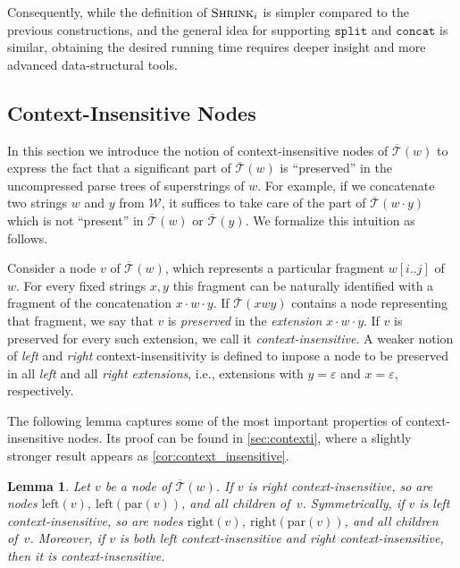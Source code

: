 \documentclass[a4paper]{article}
\newtheorem{lemma}[theorem]{Lemma}
\theoremstyle{remark}
\newcommand{\concop}{\mathtt{concat}}
\newcommand{\splitop}{\mathtt{split}}
\newcommand{\shrink}[1]{\ensuremath{\textsc{Shrink}_{#1}}}
\newcommand{\str}{w}
\newcommand{\strb}{y}
\newcommand{\ustree}{\mathcal{\overline{T}}}
\newcommand{\uspar}{\mathrm{par}}
\newcommand{\usleft}{\mathrm{left}}
\newcommand{\usright}{\mathrm{right}}
\newcommand{\coll}{\mathcal{W}}
\newcommand{\eps}{\varepsilon}
\newcommand{\edot}{{\cdot}}
\begin{document}
Consequently, while the definition of $\shrink{i}$ is simpler compared to  the previous constructions,
and the general idea for supporting $\splitop$ and $\concop$ is similar,
obtaining the desired running time requires deeper insight and more advanced data-structural tools.

\newcommand{\itstring}{\mathit{pref}}
\newcommand{\itsuf}{\mathit{suff}}

\subsection{Context-Insensitive Nodes}\label{sec:context_short}
In this section we introduce the notion of context-insensitive nodes of $\ustree(w)$ to express
the fact that a significant part of $\ustree(w)$ is ``preserved'' in the uncompressed parse trees of superstrings of $w$.
For example, if we concatenate two strings $\str$ and $\strb$ from $\coll$, it suffices to take care of the part of  $\ustree(\str \cdot \strb)$
which is not ``present'' in $\ustree(w)$ or $\ustree(y)$. We formalize this intuition as follows.

Consider a node $v$ of $\ustree(w)$, which represents a particular fragment $w[i..j]$ of $w$.
For every fixed strings $x,y$ this fragment can be naturally identified with a fragment of the concatenation $x\edot w\edot y$.
If $\ustree(xwy)$ contains a node representing that fragment, we say that $v$ is \emph{preserved} in the \emph{extension} $x\edot w \edot y$.
If $v$ is preserved for every such extension, we call it \emph{context-insensitive}.
A weaker notion of \emph{left} and \emph{right} context-insensitivity is defined to impose a node
to be preserved in  all \emph{left} and all \emph{right extensions},  i.e., extensions with $y=\eps$ and $x=\eps$, respectively.

The following lemma captures some of the most important properties of context-insensitive nodes.
Its proof can be found in \cref{sec:contexti}, where a slightly stronger result appears as \cref{cor:context_insensitive}.

\begin{lemma}\label{lem:context_insensitive} Let $v$ be a node of $\ustree(w)$.
  If $v$ is right context-insensitive, so are nodes $\usleft(v)$, $\usleft(\uspar(v))$, and all children of~$v$.
  Symmetrically, if $v$ is left context-insensitive, so are nodes $\usright(v)$, $\usright(\uspar(v))$, and all children of~$v$.
Moreover, if $v$ is both left context-insensitive and right context-insensitive, then it is context-insensitive.
\end{lemma}
\end{document}
